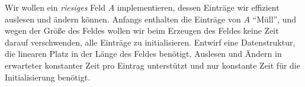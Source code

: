 \documentclass{uebung_cs}
\begin{document}
\begin{aufgabe}
	Wir wollen ein \textit{riesiges} Feld $A$ implementieren, dessen Einträge wir effizient auslesen und ändern können.
	Anfangs enthalten die Einträge von $A$ \enquote{Müll}, und wegen der Größe des Feldes wollen wir beim Erzeugen des Feldes keine Zeit darauf verschwenden, alle Einträge zu initialisieren.
	Entwirf eine Datenstruktur, die linearen Platz in der Länge des Feldes benötigt, Auslesen und Ändern in erwarteter konstanter Zeit pro Eintrag unterstützt und nur konstante Zeit für die Initialisierung benötigt.
\end{aufgabe}

  
  
\end{document}

